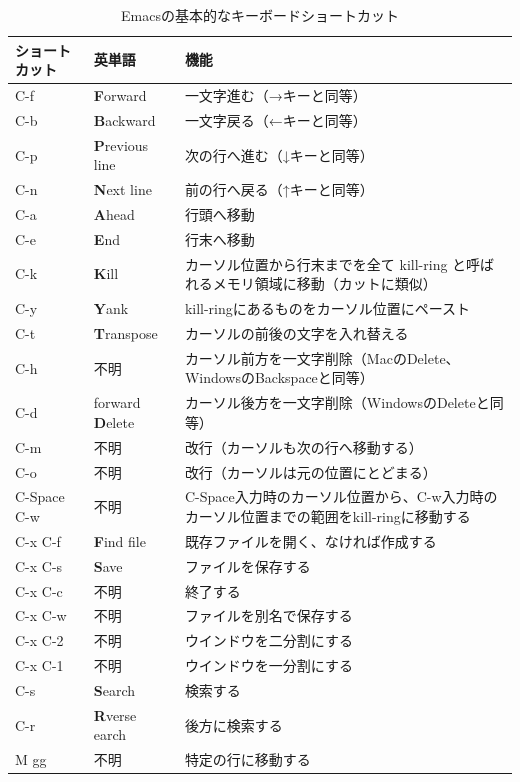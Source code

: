 \begin{table}
\begin{center}
\caption{Emacsの基本的なキーボードショートカット}
\label{tab_emacs}
\begin{tabular}{llp{10cm}}
\hline
ショートカット & 英単語 & 機能 \\ \hline\hline
C-f & {\bf F}orward & 一文字進む（→キーと同等） \\
C-b & {\bf B}ackward & 一文字戻る（←キーと同等） \\
C-p & {\bf P}revious line & 次の行へ進む（↓キーと同等） \\
C-n & {\bf N}ext line & 前の行へ戻る（↑キーと同等） \\
C-a & {\bf A}head & 行頭へ移動 \\
C-e & {\bf E}nd & 行末へ移動 \\
C-k & {\bf K}ill & カーソル位置から行末までを全て kill-ring と呼ばれるメモリ領域に移動（カットに類似） \\
C-y & {\bf Y}ank & kill-ringにあるものをカーソル位置にペースト \\
C-t & {\bf T}ranspose & カーソルの前後の文字を入れ替える \\
C-h & 不明 & カーソル前方を一文字削除（MacのDelete、WindowsのBackspaceと同等） \\
C-d & forward {\bf D}elete & カーソル後方を一文字削除（WindowsのDeleteと同等） \\
C-m & 不明 & 改行（カーソルも次の行へ移動する） \\
C-o & 不明 & 改行（カーソルは元の位置にとどまる） \\
C-Space C-w & 不明 & C-Space入力時のカーソル位置から、C-w入力時のカーソル位置までの範囲をkill-ringに移動する \\ \hline
C-x C-f & {\bf F}ind file & 既存ファイルを開く、なければ作成する \\
C-x C-s & {\bf S}ave & ファイルを保存する \\
C-x C-c & 不明 & 終了する \\
C-x C-w & 不明 & ファイルを別名で保存する \\
C-x C-2 & 不明 & ウインドウを二分割にする \\
C-x C-1 & 不明 & ウインドウを一分割にする \\
C-s & {\bf S}earch & 検索する \\
C-r & {\bf R}verse earch & 後方に検索する \\
M gg & 不明 & 特定の行に移動する\\\hline
\end{tabular}
\end{center}
\end{table}

